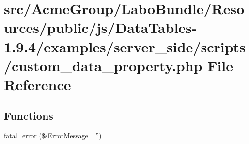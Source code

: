 \hypertarget{custom__data__property_8php}{\section{src/\+Acme\+Group/\+Labo\+Bundle/\+Resources/public/js/\+Data\+Tables-\/1.9.4/examples/server\+\_\+side/scripts/custom\+\_\+data\+\_\+property.php File Reference}
\label{custom__data__property_8php}
}
\subsection*{Functions}
\begin{DoxyCompactItemize}
\item 
\hyperlink{custom__data__property_8php_a1bb235f2e57f0389e14b11592d32119a}{fatal\+\_\+error} (\$s\+Error\+Message= '')
\end{DoxyCompactItemize}
